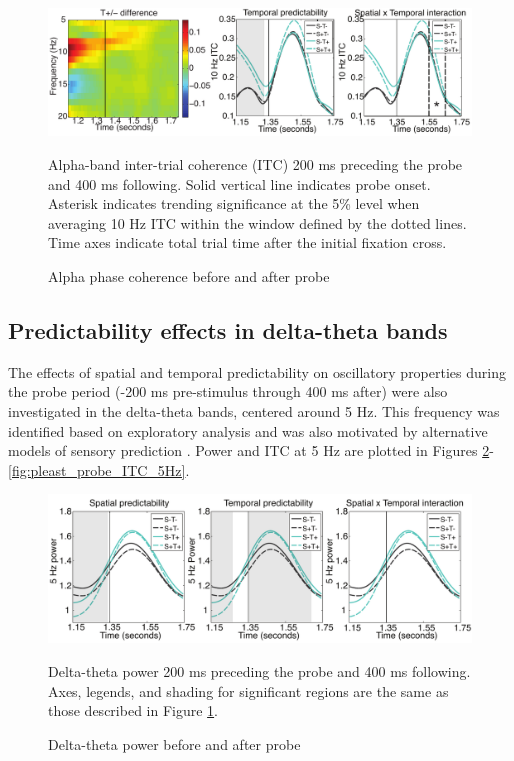\documentclass[dwyatte_dissertation.tex]{subfiles}
\begin{document}
\begin{figure}[h!]
\begin{center}
\includegraphics[width=160mm]{figs/chap_pleast/results_powphase_probe_ITC_montage.pdf}
\end{center}
\caption{Alpha phase coherence before and after probe}{Alpha-band inter-trial coherence (ITC) 200 ms preceding the probe and 400 ms following. Solid vertical line indicates probe onset. Asterisk indicates trending significance at the 5\% level when averaging 10 Hz ITC within the window defined by the dotted lines. Time axes indicate total trial time after the initial fixation cross.}
\label{fig:pleast_probe_ITC_10Hz}
\end{figure}

\subsection{Predictability effects in delta-theta bands}
The effects of spatial and temporal predictability on oscillatory properties during the probe period (-200 ms pre-stimulus through 400 ms after) were also investigated in the delta-theta bands, centered around 5 Hz. This frequency was identified based on exploratory analysis and was also motivated by alternative models of sensory prediction \cite{ArnalGiraud12,GiraudPoeppel12}. Power and ITC at 5 Hz are plotted in Figures \ref{fig:pleast_probe_pow_5Hz}-\ref{fig:pleast_probe_ITC_5Hz}.

\begin{figure}[h!]
\begin{center}
\includegraphics[width=160mm]{figs/chap_pleast/results_powphase_probe_5Hz_pow_montage.pdf}
\end{center}
\caption{Delta-theta power before and after probe}{Delta-theta power 200 ms preceding the probe and 400 ms following. Axes, legends, and shading for significant regions are the same as those described in Figure \ref{fig:pleast_probe_ITC_10Hz}.}
\label{fig:pleast_probe_pow_5Hz}
\end{figure}
\end{document}
